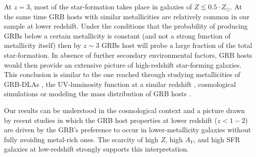 \documentclass[traditabstract, longauth]{aa}
\begin{document}
At $z=3$, most of the star-formation takes place in galaxies of $Z\lesssim0.5\cdot Z_\odot$. At the same time GRB hosts with similar metallicities are relatively common in our sample at lower redshift. Under the conditions that the probability of producing GRBs below a certain metallicity is constant (and not a strong function of metallicity itself) then by $z\sim3$ GRBs host will probe a large fraction of the total star-formation. In absence of further secondary environmental factors, GRB hosts would then provide an extensive picture of high-redshift star-forming galaxies. This conclusion is similar to the one reached through studying metallicities of GRB-DLAs \citep{2008ApJ...683..321F, 2014arXiv1410.3510A}, the UV-luminosity function at a similar redshift \citep{2005MNRAS.362..245J, 2015arXiv150304246S, 2015arXiv150305323G}, cosmological simulations \citep{2010MNRAS.408..647C} or modeling the mass distribution of GRB hosts \citep{2009ApJ...702..377K}.

Our results can be understood in the cosmological context and a picture drawn by recent studies \citep{2008AJ....135.1136M, 2009ApJ...702..377K, 2013ApJ...778..128P, 2014arXiv1409.7064V, 2014arXiv1406.1503T, 2015arXiv150402479P,  2015arXiv150304246S} in which the GRB host properties at lower redshift ($z < 1-2$) are driven by the GRB's preference to occur in lower-metallicity galaxies without fully avoiding metal-rich ones. The scarcity of high $Z$, high $A_V$, and high SFR galaxies at low-redshift strongly supports this interpretation.
\end{document}
